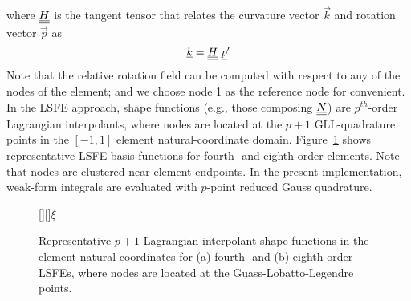 where $\underline{\underline{H}}$ is the tangent tensor that relates the curvature vector $\vec{k}$ and rotation vector $\vec{p}$ as
\begin{equation}
    \label{Tensor}
    \underline{k} = \underline{\underline{H}}~ \underline{p}^\prime
\end{equation}
Note that the relative rotation field can be computed with respect to any of the nodes of the element; and we choose node 1 as the reference node for convenient. In the LSFE approach, shape functions (e.g., those composing $\underline{\underline{N}}$) are
$p^{th}$-order Lagrangian interpolants, where nodes are located at the $p+1$
GLL-quadrature points in the $[-1,1]$ element natural-coordinate domain.
Figure~\ref{fig:N4_lsfe} shows representative LSFE basis functions for  
fourth- and eighth-order elements.  Note that nodes are clustered near
element endpoints.
In the present implementation, weak-form integrals are evaluated with
$p$-point reduced Gauss quadrature.

\begin{figure}
    \centering
    [][]{$\xi$}
    \caption{Representative $p+1$ Lagrangian-interpolant shape functions in
the element natural coordinates for
(a) fourth- and (b) eighth-order LSFEs, where nodes are located at the
Guass-Lobatto-Legendre points.}
    \label{fig:N4_lsfe}
\end{figure}


